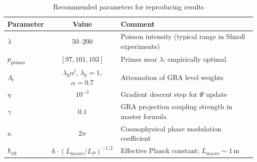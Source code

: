 \documentclass[12pt,a4paper]{article}
\theoremstyle{plain}
\theoremstyle{definition}
\theoremstyle{remark}
\newcommand{\eff}{\text{eff}}
\begin{document}
\begin{table}[H]
\centering
\caption{Recommended parameters for reproducing results}
\label{tab:sim-params}
\renewcommand{\arraystretch}{1.3}
\begin{tabular}{@{}lcp{7cm}@{}}
\toprule
\textbf{Parameter} & \textbf{Value} & \textbf{Comment} \\
\midrule
$\lambda$ & $50$--$200$ & Poisson intensity (typical range in Shnoll experiments) \\
\addlinespace
$p_{\text{primes}}$ & $[97, 101, 103]$ & Primes near $\lambda$; empirically optimal \\
\addlinespace
$\Lambda_l$ & $\lambda_0 \alpha^l$, $\lambda_0=1$, $\alpha=0.7$ & Attenuation of GRA level weights \\
\addlinespace
$\eta$ & $10^{-3}$ & Gradient descent step for $\Psi$ update \\
\addlinespace
$\gamma$ & $0.1$ & GRA projection coupling strength in master formula \\
\addlinespace
$\kappa$ & $2\pi$ & Cosmophysical phase modulation coefficient \\
\addlinespace
$\hbar_{\eff}$ & $\hbar \cdot (L_{\text{macro}}/L_P)^{-1/2}$ & Effective Planck constant; $L_{\text{macro}} \sim 1$\,m \\
\bottomrule
\end{tabular}
\end{table}
\end{document}
